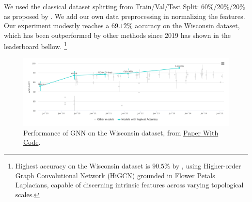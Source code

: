 \documentclass{article}
\theoremstyle{plain}
\theoremstyle{definition}
\theoremstyle{remark}
\begin{document}
We used the classical dataset splitting from Train/Val/Test Split: $60\%/20\%/20\%$ 
as proposed by \cite{attali2024delaunay}. We add our own data preprocessing in normalizing the features.
Our experiment modestly reaches a $69.12\%$ accuracy on the Wisconsin dataset,
which has been outperformed by other methods since 2019 has shown in the leaderboard bellow.
\footnote{Highest accuracy on the Wisconsin dataset is $90.5\%$ by \cite{huang2024higherordergraphconvolutionalnetwork}, using
Higher-order Graph Convolutional Network (HiGCN) grounded in Flower Petals Laplacians, 
capable of discerning intrinsic features across varying topological scales. }

\begin{figure}[htb!]
    \includegraphics[width=\textwidth]{figures/Wisconsin_leaderboard.png}
    \caption{Performance of GNN on the Wisconsin dataset, from \href{https://paperswithcode.com/sota/node-classification-on-wisconsin}{Paper With Code}.}
    \label{fig:wisconsin_leaderboard}
\end{figure}
\end{document}
